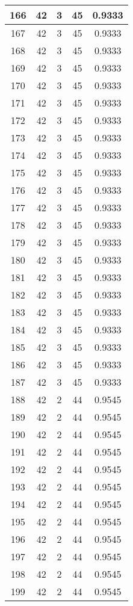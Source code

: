 \documentclass[letterpaper, 12pt]{article}
\begin{document}
\begin{longtable}{|c|c|c|c|c|}
\hline
166 & 42 & 3 & 45 & 0.9333 \\
\hline
167 & 42 & 3 & 45 & 0.9333 \\
\hline
168 & 42 & 3 & 45 & 0.9333 \\
\hline
169 & 42 & 3 & 45 & 0.9333 \\
\hline
170 & 42 & 3 & 45 & 0.9333 \\
\hline
171 & 42 & 3 & 45 & 0.9333 \\
\hline
172 & 42 & 3 & 45 & 0.9333 \\
\hline
173 & 42 & 3 & 45 & 0.9333 \\
\hline
174 & 42 & 3 & 45 & 0.9333 \\
\hline
175 & 42 & 3 & 45 & 0.9333 \\
\hline
176 & 42 & 3 & 45 & 0.9333 \\
\hline
177 & 42 & 3 & 45 & 0.9333 \\
\hline
178 & 42 & 3 & 45 & 0.9333 \\
\hline
179 & 42 & 3 & 45 & 0.9333 \\
\hline
180 & 42 & 3 & 45 & 0.9333 \\
\hline
181 & 42 & 3 & 45 & 0.9333 \\
\hline
182 & 42 & 3 & 45 & 0.9333 \\
\hline
183 & 42 & 3 & 45 & 0.9333 \\
\hline
184 & 42 & 3 & 45 & 0.9333 \\
\hline
185 & 42 & 3 & 45 & 0.9333 \\
\hline
186 & 42 & 3 & 45 & 0.9333 \\
\hline
187 & 42 & 3 & 45 & 0.9333 \\
\hline
188 & 42 & 2 & 44 & 0.9545 \\
\hline
189 & 42 & 2 & 44 & 0.9545 \\
\hline
190 & 42 & 2 & 44 & 0.9545 \\
\hline
191 & 42 & 2 & 44 & 0.9545 \\
\hline
192 & 42 & 2 & 44 & 0.9545 \\
\hline
193 & 42 & 2 & 44 & 0.9545 \\
\hline
194 & 42 & 2 & 44 & 0.9545 \\
\hline
195 & 42 & 2 & 44 & 0.9545 \\
\hline
196 & 42 & 2 & 44 & 0.9545 \\
\hline
197 & 42 & 2 & 44 & 0.9545 \\
\hline
198 & 42 & 2 & 44 & 0.9545 \\
\hline
199 & 42 & 2 & 44 & 0.9545 \\
\hline
\end{longtable}
\end{document}
